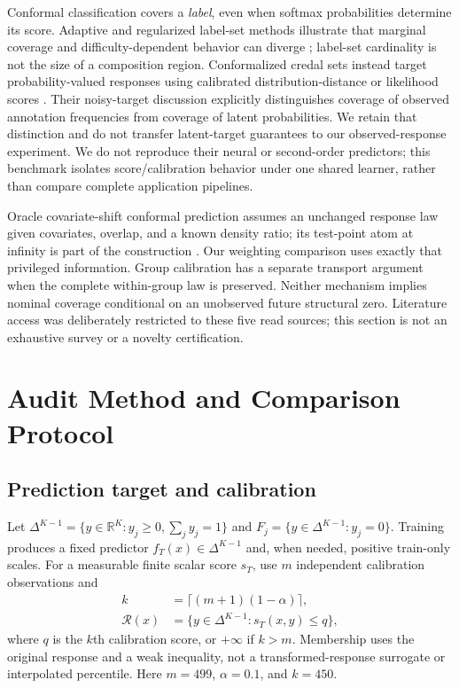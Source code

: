 \documentclass{article}
\theoremstyle{plain}
\newcommand{\simp}{\Delta^{K-1}}
\newcommand{\R}{\mathcal{R}}
\begin{document}
Conformal classification covers a \emph{label}, even when softmax probabilities determine its score. Adaptive and regularized label-set methods illustrate that marginal coverage and difficulty-dependent behavior can diverge \citep{angelopoulos2020uncertaintysets}; label-set cardinality is not the size of a composition region. Conformalized credal sets instead target probability-valued responses using calibrated distribution-distance or likelihood scores \citep{javanmardi2024credal}. Their noisy-target discussion explicitly distinguishes coverage of observed annotation frequencies from coverage of latent probabilities. We retain that distinction and do not transfer latent-target guarantees to our observed-response experiment. We do not reproduce their neural or second-order predictors; this benchmark isolates score/calibration behavior under one shared learner, rather than compare complete application pipelines.

Oracle covariate-shift conformal prediction assumes an unchanged response law given covariates, overlap, and a known density ratio; its test-point atom at infinity is part of the construction \citep{tibshirani2019covariateshift}. Our weighting comparison uses exactly that privileged information. Group calibration has a separate transport argument when the complete within-group law is preserved. Neither mechanism implies nominal coverage conditional on an unobserved future structural zero. Literature access was deliberately restricted to these five read sources; this section is not an exhaustive survey or a novelty certification.

\section{Audit Method and Comparison Protocol}
\label{sec:method}
\subsection{Prediction target and calibration}
Let $\simp=\{y\in\mathbb{R}^K:y_j\geq0,\sum_jy_j=1\}$ and $F_j=\{y\in\simp:y_j=0\}$. Training produces a fixed predictor $f_T(x)\in\simp$ and, when needed, positive train-only scales. For a measurable finite scalar score $s_T$, use $m$ independent calibration observations and
\begin{equation}
 \begin{aligned}
 k&=\lceil(m+1)(1-\alpha)\rceil,\\
 \R(x)&=\{y\in\simp:s_T(x,y)\leq q\},
 \end{aligned}
 \label{eq:split}
\end{equation}
where $q$ is the $k$th calibration score, or $+\infty$ if $k>m$. Membership uses the original response and a weak inequality, not a transformed-response surrogate or interpolated percentile. Here $m=499$, $\alpha=0.1$, and $k=450$.
\end{document}

